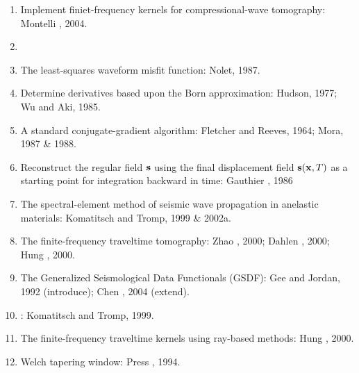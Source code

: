 \begin{enumerate}[\hspace{10mm}*]
  \item Implement finiet-frequency kernels for compressional-wave tomography: Montelli \etal, 2004.
  \item \sline
  \item The least-squares waveform misfit function: Nolet, 1987.
  \item Determine \Frechet derivatives based upon the Born approximation: Hudson, 1977; Wu and Aki, 1985.
  \item A standard conjugate-gradient algorithm: Fletcher and Reeves, 1964; Mora, 1987 \& 1988.
  \item Reconstruct the regular field $\mathbf{s}$ using the final displacement field $\mathbf{s}(\mathbf{x},T)$ as a starting point for integration backward in time: Gauthier \etal, 1986
  \item The spectral-element method of seismic wave propagation in anelastic materials: Komatitsch and Tromp, 1999 \& 2002a.
  \item The finite-frequency traveltime tomography: Zhao \etal, 2000; Dahlen \etal, 2000; Hung \etal, 2000.
  \item The Generalized Seismological Data Functionals (GSDF): Gee and Jordan, 1992 (introduce); Chen \etal, 2004 (extend).
  \item {}: Komatitsch and Tromp, 1999.
  \item The finite-frequency traveltime kernels using ray-based methods: Hung \etal, 2000.
  \item Welch tapering window: Press \etal, 1994.
\end{enumerate}\par
